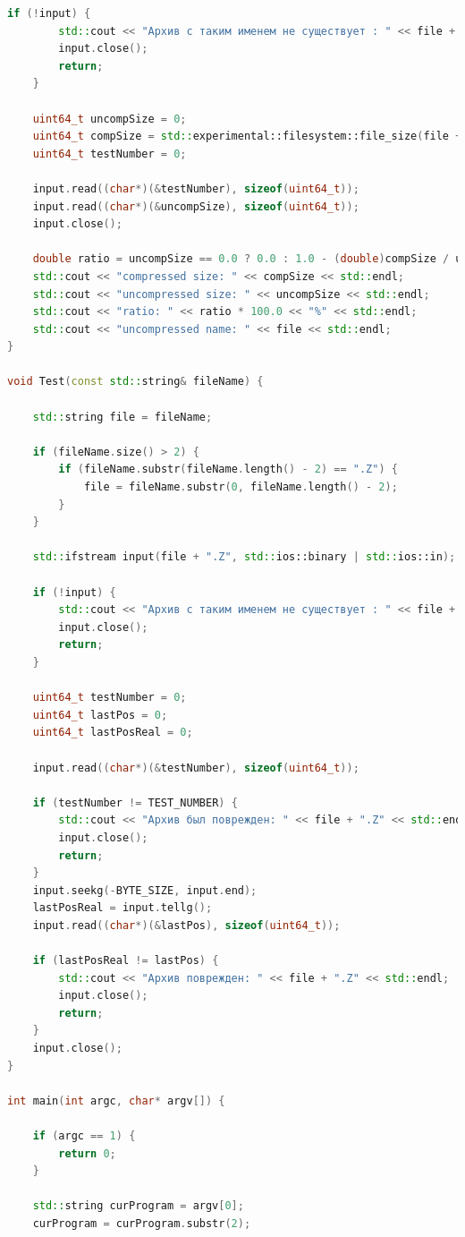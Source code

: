 \documentclass[14pt]{article}
\begin{document}
\begin{lstlisting}[language=C++]
    if (!input) {
        std::cout << "Архив с таким именем не существует : " << file + ".Z" << std::endl;
        input.close();
        return;
    }

    uint64_t uncompSize = 0;
    uint64_t compSize = std::experimental::filesystem::file_size(file + ".Z");
    uint64_t testNumber = 0;

    input.read((char*)(&testNumber), sizeof(uint64_t));
    input.read((char*)(&uncompSize), sizeof(uint64_t));
    input.close();

    double ratio = uncompSize == 0.0 ? 0.0 : 1.0 - (double)compSize / uncompSize;
    std::cout << "compressed size: " << compSize << std::endl;
    std::cout << "uncompressed size: " << uncompSize << std::endl;
    std::cout << "ratio: " << ratio * 100.0 << "%" << std::endl;
    std::cout << "uncompressed name: " << file << std::endl; 
}

void Test(const std::string& fileName) {

    std::string file = fileName;

    if (fileName.size() > 2) {
        if (fileName.substr(fileName.length() - 2) == ".Z") {
            file = fileName.substr(0, fileName.length() - 2);
        }
    }

    std::ifstream input(file + ".Z", std::ios::binary | std::ios::in);

    if (!input) {
        std::cout << "Архив с таким именем не существует : " << file + ".Z" << std::endl;
        input.close();
        return;
    }

    uint64_t testNumber = 0;
    uint64_t lastPos = 0;
    uint64_t lastPosReal = 0;

    input.read((char*)(&testNumber), sizeof(uint64_t));

    if (testNumber != TEST_NUMBER) {
        std::cout << "Архив был поврежден: " << file + ".Z" << std::endl;
        input.close();
        return;
    }
    input.seekg(-BYTE_SIZE, input.end);
    lastPosReal = input.tellg();
    input.read((char*)(&lastPos), sizeof(uint64_t));

    if (lastPosReal != lastPos) {
        std::cout << "Архив поврежден: " << file + ".Z" << std::endl;
        input.close();
        return;
    }
    input.close();
}
 
int main(int argc, char* argv[]) {

    if (argc == 1) {
        return 0;
    }

    std::string curProgram = argv[0];
    curProgram = curProgram.substr(2);


\end{lstlisting}
\end{document}
